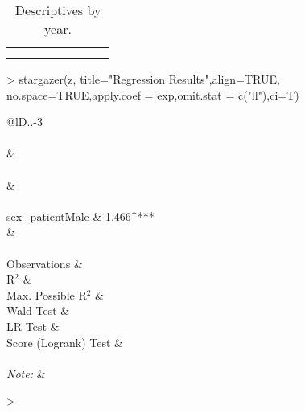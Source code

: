 \documentclass{article}
\begin{document}
\begin{Schunk}
\begin{small}
\begin{longtable}{lccccccc}
    \hline\\ \caption{Descriptives by year.}\\
    \end{longtable}\end{small} \begin{Sinput}
> stargazer(z, title="Regression Results",align=TRUE, no.space=TRUE,apply.coef = exp,omit.stat = c("ll"),ci=T)
\end{Sinput}
% Table created by stargazer v.5.2 by Marek Hlavac, Harvard University. E-mail: hlavac at fas.harvard.edu
% Date and time: lun., mai 15, 2017 - 18:18:36
% Requires LaTeX packages: dcolumn 
\begin{table}[!htbp] \centering 
  \caption{Regression Results} 
  \label{} 
\begin{tabular}{@{\extracolsep{5pt}}lD{.}{.}{-3} } 
\\[-1.8ex]\hline 
\hline \\[-1.8ex] 
 &  \\ 
\\[-1.8ex] &  \\ 
\hline \\[-1.8ex] 
 sex\_patientMale & 1.466^{***} \\ 
  &  \\ 
 \hline \\[-1.8ex] 
Observations &  \\ 
R$^{2}$ &  \\ 
Max. Possible R$^{2}$ &  \\ 
Wald Test &  \\ 
LR Test &  \\ 
Score (Logrank) Test &  \\ 
\hline 
\hline \\[-1.8ex] 
\textit{Note:}  &  \\ 
\end{tabular} 
\end{table} \begin{Sinput}
> 
\end{Sinput}
\end{Schunk}
\end{document}
